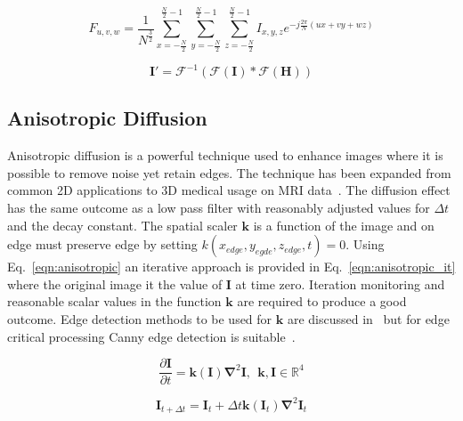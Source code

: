 \documentclass[journal]{IEEEtran}
\begin{document}
\begin{equation}
	F_{u,v,w} = \frac{1}{N^{\frac{3}{2}}} \sum\limits_{x=-\frac{N}{2}}^{\frac{N}{2}-1}\sum\limits_{y=-\frac{N}{2}}^{\frac{N}{2}-1}\sum\limits_{z=-\frac{N}{2}}^{\frac{N}{2}-1}I_{x,y,z}e^{-j\frac{2\pi}{N}(ux + vy + wz)}
	\label{eqn:dft} 
\end{equation}


\begin{equation}
	\textbf{I}' = \mathcal{F}^{-1}(\mathcal{F}(\textbf{I})*\mathcal{F}(\textbf{H}))	%
	\label{eqn:same} 
\end{equation}


\subsection{Anisotropic Diffusion}
Anisotropic diffusion is a powerful technique used to enhance images where it is possible to remove noise yet retain edges.
The technique has been expanded from common 2D applications to 3D medical usage on MRI data~\cite{nakh11three}.
The diffusion effect has the same outcome as a low pass filter with reasonably adjusted values for $\Delta t$ and the decay constant.
The spatial scaler $\mathbf{k}$ is a function of the image and on edge must preserve edge by setting $k(x_{edge},y_{egde},z_{edge},t) = 0$.
Using Eq.~\eqref{eqn:anisotropic} an iterative approach is provided in Eq.~\eqref{eqn:anisotropic_it} where the original image it the value of $\mathbf{I}$ at time zero.
Iteration monitoring and reasonable scalar values in the function $\mathbf{k}$ are required to produce a good outcome.
Edge detection methods to be used for $\mathbf{k}$ are discussed in~\cite{nixon02feature} but for edge critical processing Canny edge detection is suitable~\cite{canny86edge}. 

\begin{equation}
	\frac{\partial \mathbf{I}}{\partial t} = \mathbf{k(\mathbf{I})} \mathbf{\nabla}^2 \mathbf{I},\:\:\mathbf{k},\mathbf{I} \in \mathbb{R}^4
	\label{eqn:anisotropic} 
\end{equation}

\begin{equation}
	\mathbf{I}_{t + \Delta t} = \mathbf{I}_t + \Delta t\mathbf{k}(\mathbf{I}_t)\mathbf{\nabla}^2\mathbf{I}_t
	\label{eqn:anisotropic_it} 
\end{equation}
\end{document}
